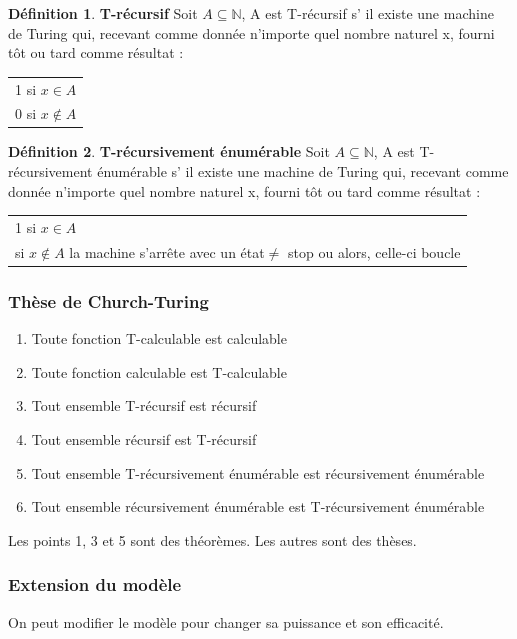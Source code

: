 \documentclass[11pt,a4paper]{article}
\newcommand{\N}{\mathbb{N}}
\theoremstyle{definition}
\newtheorem{mydef}{Définition}
\begin{document}
\begin{mydef}
	\textbf{T-récursif} Soit $A\subseteq \N$, A est T-récursif s’ il existe 
	une machine de Turing qui, recevant comme donnée n'importe quel nombre 
	naturel x, fourni tôt ou tard comme résultat : 
	\begin{tabular}{l}
		1 si $x\in A$ \\
		0 si $x\notin A$ \\
	\end{tabular}
\end{mydef}

\begin{mydef}
	\textbf{T-récursivement énumérable} Soit $A\subseteq \N$, A est 
	T-récursivement énumérable s’ il existe 
	une machine de Turing qui, recevant comme donnée n'importe quel nombre 
	naturel x, fourni tôt ou tard comme résultat : \\
	\begin{tabular}{l}
		1 si $x\in A$ \\
		si $x\notin A$ la machine s'arrête avec un état$\neq$ stop ou 
		alors, celle-ci boucle\\
	\end{tabular}
\end{mydef}

\subsubsection{Thèse de Church-Turing}
\begin{enumerate}
	\item Toute fonction T-calculable est calculable
	\item Toute fonction calculable est T-calculable
	\item Tout ensemble T-récursif est récursif
	\item Tout ensemble récursif est T-récursif
	\item Tout ensemble T-récursivement énumérable est récursivement 
		énumérable
	\item Tout ensemble récursivement énumérable est T-récursivement 
		énumérable
\end{enumerate}
Les points 1, 3 et 5 sont des théorèmes. Les autres sont des thèses.

\subsubsection{Extension du modèle}
On peut modifier le modèle pour changer sa puissance et son efficacité.
\end{document}
